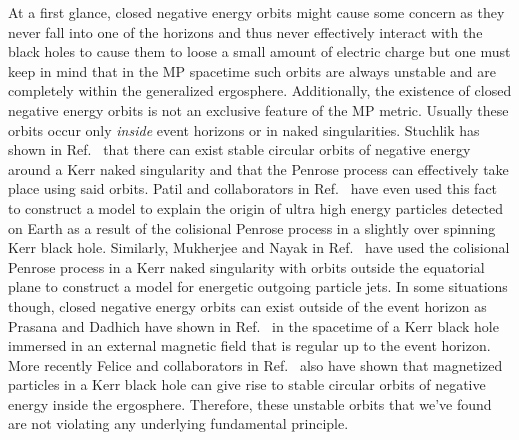 At a first glance, closed negative energy orbits might cause some concern as they never fall into one of the horizons and thus never effectively interact with the black holes to cause them to loose a small amount of electric charge but one must keep in mind that in the MP spacetime such orbits are always unstable and are completely within the generalized ergosphere. Additionally, the existence of closed negative energy orbits is not an exclusive feature of the MP metric. Usually these orbits occur only \emph{inside} event horizons or in naked singularities. Stuchlik has shown in Ref.~\cite{STUCHLIK1980} that there can exist stable circular orbits of negative energy around a Kerr naked singularity and that the Penrose process can effectively take place using said orbits. Patil and collaborators in Ref.~ \cite{PATIL2016} have even used this fact to construct a model to explain the origin of ultra high energy particles detected on Earth as a result of the colisional Penrose process in a slightly over spinning Kerr black hole. Similarly, Mukherjee and Nayak  in Ref.~\cite{MUKHERJEE2018} have used the colisional Penrose process in a Kerr naked singularity with orbits outside the equatorial plane to construct a model for energetic outgoing particle jets. In some situations though, closed negative energy orbits can exist outside of the event horizon as Prasana and Dadhich have shown in Ref.~\cite{PRASANA1982} in the spacetime of a Kerr black hole immersed in an external magnetic field that is regular up to the event horizon. More recently Felice and collaborators in Ref.~\cite{FELICE2004} also have shown that magnetized particles in a Kerr black hole can give rise to stable circular orbits of negative energy inside the ergosphere. Therefore, these unstable orbits that we've found are not violating any underlying fundamental principle.

